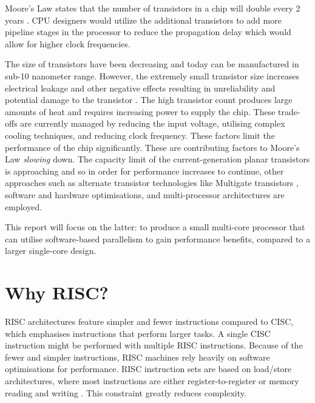 Moore's Law states that the number of transistors in a chip will double every 2 years \cite{}. CPU designers would utilize the  additional transistors to add more pipeline stages in the processor to reduce the propagation delay \cite{} which would allow for higher clock frequencies. 


The size of transistors have been decreasing \cite{} and today can be manufactured in sub-10 nanometer range. However, the extremely small transistor size increases electrical leakage and other negative effects resulting in unreliability and potential damage to the transistor \cite{}.  The high transistor count produces large amounts of heat and requires increasing power to supply the chip. These trade-offs are currently managed by reducing the input voltage, utilising complex cooling techniques, and reducing clock frequency. These factors limit the performance of the chip significantly.
These are contributing factors to Moore's Law \textit{slowing} down. 
The capacity limit of the current-generation planar transistors is approaching and so in order for performance increases to continue, other approaches such as alternate transistor technologies like Multigate transistors \cite{subramanian2010multiple}, software and hardware optimisations, and multi-processor architectures are employed.

This report will focus on the latter: to produce a small multi-core processor that can utilise software-based parallelism to gain performance benefits, compared to a larger single-core design.

\section{Why RISC?}
RISC architectures feature simpler and fewer instructions compared to CISC, which emphasises instructions that perform larger tasks. A single CISC instruction might be performed with multiple RISC instructions. Because of the fewer and simpler instructions, RISC machines rely heavily on software optimisations for performance. 
RISC instruction sets are based on load/store architectures, where most instructions are either register-to-register or memory reading and writing \cite{flynn1995computer}. This constraint greatly reduces complexity.

